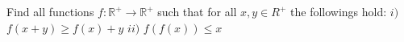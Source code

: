 Find all functions $f:\mathbb{R^+}\to\mathbb {R^+} $ such that for all $x,y\in R^+$ the followings hold:
$i) $ $f (x+y)\ge f (x)+y $
$ii) $ $f (f (x))\le x $